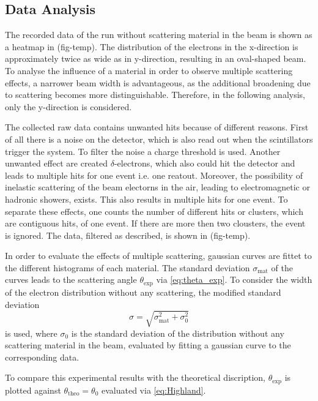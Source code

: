 \documentclass[sn-mathphys-num,iicol]{sn-jnl}
\theoremstyle{thmstyleone}
\theoremstyle{thmstyletwo}
\theoremstyle{thmstylethree}
\begin{document}
\subsection{Data Analysis}
The recorded data of the run without scattering material in the beam is shown as a heatmap in (fig-temp). The distribution of the electrons in the x-direction is approximately twice as wide as in y-direction, resulting in an oval-shaped beam.
To analyse the influence of a material in order to observe multiple scattering effects, a narrower beam width is advantageous, as the additional broadening due to scattering becomes more distinguishable. Therefore, in the following analysis, only the y-direction is considered.

The collected raw data contains unwanted hits because of different reasons. First of all there is a noise on the detector, which is also read out when the scintillators trigger the system. To filter the noise a charge threshold is used.
Another unwanted effect are created $\delta$-electrons, which also could hit the detector and leads to multiple hits for one event i.e. one reatout. Moreover, the possibility of inelastic scattering of the beam electorns in the air, leading to electromagnetic or hadronic showers, exists. This also results in multiple hits for one event. To separate these effects, one counts the number of different hits or clusters, which are contiguous hits, of one event. If there are more then two clousters, the event is ignored. The data, filtered as described, is shown in (fig-temp).

In order to evaluate the effects of multiple scattering, gaussian curves are fittet to the different histograms of each material. The standard deviation $\sigma_\text{mat}$ of the curves leads to the scattering angle $\theta_\text{exp}$ via \autoref{eq:theta_exp}. To consider the width of the electron distribution without any scattering, the modified standard deviation
\begin{equation} \label{eq:sigma_mod}
  \sigma = \sqrt{\sigma_\text{mat}^2 + \sigma_\text{0}^2}
\end{equation}
is used, where $\sigma_\text{0}$ is the standard deviation of the distribution without any scattering material in the beam, evaluated by fitting a gaussian curve to the corresponding data.

To compare this experimental results with the theoretical discription, $\theta_\text{exp}$ is plotted against $\theta_\text{theo} = \theta_0$ evaluated via \autoref{eq:Highland}.
\end{document}
